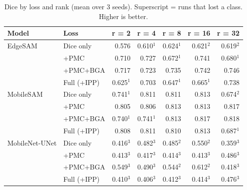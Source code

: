 \documentclass[10pt]{article}
\begin{document}
\begin{table}[H]\centering\footnotesize
\begin{tabular}{l l r r r r r}
\toprule
Model & Loss & r = 2 & r = 4 & r = 8 & r = 16 & r = 32 \\
\midrule
EdgeSAM & Dice only & 0.576 & 0.610$^{1}$ & 0.624$^{1}$ & 0.621$^{2}$ & 0.619$^{2}$ \\
 & +PMC & 0.710 & 0.727 & 0.672$^{1}$ & 0.741 & 0.680$^{1}$ \\
 & +PMC+BGA & 0.717 & 0.723 & 0.735 & 0.742 & 0.746 \\
 & Full (+IPP) & 0.625$^{1}$ & 0.703 & 0.647$^{1}$ & 0.665$^{1}$ & 0.738 \\
\midrule
MobileSAM & Dice only & 0.741$^{1}$ & 0.811 & 0.811 & 0.813 & 0.674$^{2}$ \\
 & +PMC & 0.805 & 0.806 & 0.813 & 0.813 & 0.817 \\
 & +PMC+BGA & 0.740$^{1}$ & 0.741$^{1}$ & 0.813 & 0.817 & 0.818 \\
 & Full (+IPP) & 0.808 & 0.811 & 0.810 & 0.813 & 0.687$^{1}$ \\
\midrule
MobileNet-UNet & Dice only & 0.416$^{3}$ & 0.482$^{3}$ & 0.485$^{2}$ & 0.550$^{2}$ & 0.359$^{3}$ \\
 & +PMC & 0.413$^{3}$ & 0.417$^{3}$ & 0.414$^{3}$ & 0.413$^{3}$ & 0.486$^{3}$ \\
 & +PMC+BGA & 0.549$^{3}$ & 0.490$^{3}$ & 0.544$^{2}$ & 0.612$^{2}$ & 0.418$^{3}$ \\
 & Full (+IPP) & 0.410$^{3}$ & 0.406$^{3}$ & 0.412$^{3}$ & 0.414$^{3}$ & 0.476$^{3}$ \\
\bottomrule
\end{tabular}
\caption{Dice by loss and rank (mean over 3 seeds). Superscript = runs that lost a class. Higher is better.}\label{tab:dice_matrix}
\end{table}
\end{document}
